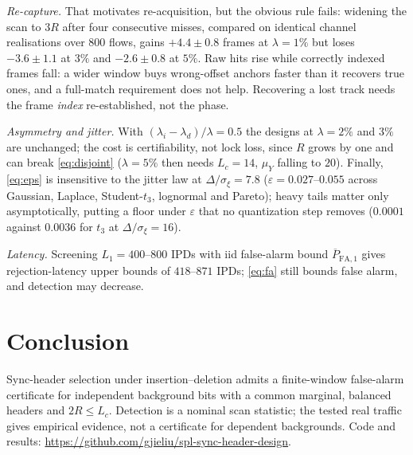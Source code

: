 \documentclass[journal]{IEEEtran}
\newcommand{\sxi}{\sigma_\xi}
\newcommand{\muY}{\mu_Y}
\newcommand{\pbit}{\varepsilon}
\begin{document}
\emph{Re-capture.} That motivates re-acquisition, but the obvious rule fails: widening the scan to $3R$ after four consecutive misses, compared on identical channel realisations over $800$ flows, gains $+4.4\pm0.8$ frames at $\lambda=1\%$ but loses $-3.6\pm1.1$ at $3\%$ and $-2.6\pm0.8$ at $5\%$. Raw hits rise while correctly indexed frames fall: a wider window buys wrong-offset anchors faster than it recovers true ones, and a full-match requirement does not help. Recovering a lost track needs the frame \emph{index} re-established, not the phase.

\emph{Asymmetry and jitter.} With $(\lambda_i-\lambda_d)/\lambda=0.5$ the designs at $\lambda=2\%$ and $3\%$ are unchanged; the cost is certifiability, not lock loss, since $R$ grows by one and can break \eqref{eq:disjoint} ($\lambda=5\%$ then needs $L_c=14$, $\muY$ falling to $20$). Finally, \eqref{eq:eps} is insensitive to the jitter law at $\Delta/\sxi=7.8$ ($\pbit=0.027$--$0.055$ across Gaussian, Laplace, Student-$t_3$, lognormal and Pareto); heavy tails matter only asymptotically, putting a floor under $\pbit$ that no quantization step removes ($0.0001$ against $0.0036$ for $t_3$ at $\Delta/\sxi=16$).

\emph{Latency.} Screening $L_1=400$--$800$ IPDs with iid false-alarm bound $\overline P_{\mathrm{FA},1}$ gives rejection-latency upper bounds of $418$--$871$ IPDs; \eqref{eq:fa} still bounds false alarm, and detection may decrease.


\section{Conclusion}
\label{sec:conclusion}
Sync-header selection under insertion--deletion admits a finite-window false-alarm certificate for independent background bits with a common marginal, balanced headers and $2R\le L_c$. Detection is a nominal scan statistic; the tested real traffic gives empirical evidence, not a certificate for dependent backgrounds. Code and results: \url{https://github.com/gjieliu/spl-sync-header-design}.



\end{document}
